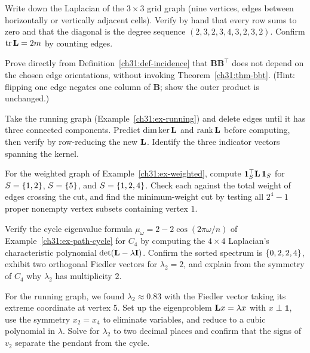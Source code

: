 \begin{exercise}[Build it]\label{ch31:ex-build}
Write down the Laplacian of the $3\times3$ grid graph (nine vertices, edges between horizontally or vertically adjacent cells). Verify by hand that every row sums to zero and that the diagonal is the degree sequence $(2,3,2,3,4,3,2,3,2)$. Confirm $\operatorname{tr}\mathbf{L} = 2m$ by counting edges.
\end{exercise}

\begin{exercise}\label{ch31:ex-orient}
Prove directly from Definition~\ref{ch31:def-incidence} that $\mathbf{B}\mathbf{B}^\top$ does not depend on the chosen edge orientations, without invoking Theorem~\ref{ch31:thm-bbt}. (Hint: flipping one edge negates one column of $\mathbf{B}$; show the outer product is unchanged.)
\end{exercise}

\begin{exercise}\label{ch31:ex-rank-drop}
Take the running graph (Example~\ref{ch31:ex-running}) and delete edges until it has three connected components. Predict $\dim\ker\mathbf{L}$ and $\operatorname{rank}\mathbf{L}$ before computing, then verify by row-reducing the new $\mathbf{L}$. Identify the three indicator vectors spanning the kernel.
\end{exercise}

\begin{exercise}[Cut = quadratic form]\label{ch31:ex-cut-form}
For the weighted graph of Example~\ref{ch31:ex-weighted}, compute $\mathbf{1}_S^\top\mathbf{L}\,\mathbf{1}_S$ for $S = \{1,2\}$, $S=\{5\}$, and $S=\{1,2,4\}$. Check each against the total weight of edges crossing the cut, and find the minimum-weight cut by testing all $2^4-1$ proper nonempty vertex subsets containing vertex $1$.
\end{exercise}

\begin{exercise}\label{ch31:ex-cycle}
Verify the cycle eigenvalue formula $\mu_\omega = 2-2\cos(2\pi\omega/n)$ of Example~\ref{ch31:ex-path-cycle} for $C_4$ by computing the $4\times4$ Laplacian's characteristic polynomial $\det(\mathbf{L} - \lambda\mathbf{I})$. Confirm the sorted spectrum is $\{0,2,2,4\}$, exhibit two orthogonal Fiedler vectors for $\lambda_2 = 2$, and explain from the symmetry of $C_4$ why $\lambda_2$ has multiplicity $2$.
\end{exercise}

\begin{exercise}\label{ch31:ex-fiedler-hand}
For the running graph, we found $\lambda_2 \approx 0.83$ with the Fiedler vector taking its extreme coordinate at vertex $5$. Set up the eigenproblem $\mathbf{L} x = \lambda x$ with $x\perp\mathbf{1}$, use the symmetry $x_2=x_4$ to eliminate variables, and reduce to a cubic polynomial in $\lambda$. Solve for $\lambda_2$ to two decimal places and confirm that the signs of $v_2$ separate the pendant from the cycle.
\end{exercise}

